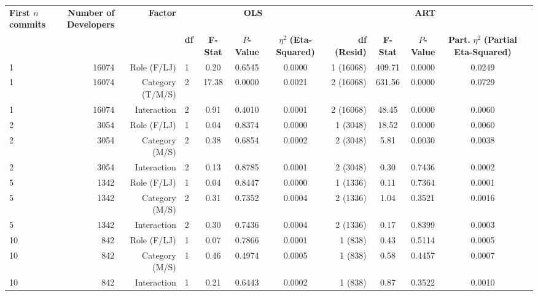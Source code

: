 \begin{landscape}
\begin{table}[H]
{}
\begin{tabular}{l r r l ccc r ccc r}
\toprule
\makecell[t]{\textbf{First $n$}\\\textbf{commits}} & \makecell[t]{\textbf{Number of}\\\textbf{Developers}} & \textbf{Factor} & \multicolumn{4}{c}{\textbf{OLS}} & \multicolumn{4}{c}{\textbf{ART}} \\ 
\cmidrule(lr){4-7} \cmidrule(lr){8-11}
 &  &  & \textbf{df} & \textbf{F-Stat} & \textbf{$P$-Value} & \makecell[t]{\textbf{$\eta^2$}\\\textbf{(Eta-Squared)}} & \textbf{df (Resid)} & \textbf{F-Stat} & \textbf{$P$-Value} & \makecell[t]{\textbf{Part.}\\\textbf{$\eta^2$}\\\textbf{(Partial}\\\textbf{Eta-Squared)}} \\ 
\midrule
1 & 16074 & Role (F/LJ) & 1 & 0.20 & 0.6545 & 0.0000 & 1 (16068) & 409.71 & 0.0000 & 0.0249 \\ 
1 & 16074 & Category (T/M/S) & 2 & 17.38 & 0.0000 & 0.0021 & 2 (16068) & 631.56 & 0.0000 & 0.0729 \\ 
1 & 16074 & Interaction & 2 & 0.91 & 0.4010 & 0.0001 & 2 (16068) & 48.45 & 0.0000 & 0.0060 \\ 
2 & 3054 & Role (F/LJ) & 1 & 0.04 & 0.8374 & 0.0000 & 1 (3048) & 18.52 & 0.0000 & 0.0060 \\ 
2 & 3054 & Category (M/S) & 2 & 0.38 & 0.6854 & 0.0002 & 2 (3048) & 5.81 & 0.0030 & 0.0038 \\ 
2 & 3054 & Interaction & 2 & 0.13 & 0.8785 & 0.0001 & 2 (3048) & 0.30 & 0.7436 & 0.0002 \\ 
5 & 1342 & Role (F/LJ) & 1 & 0.04 & 0.8447 & 0.0000 & 1 (1336) & 0.11 & 0.7364 & 0.0001 \\ 
5 & 1342 & Category (M/S) & 2 & 0.31 & 0.7352 & 0.0004 & 2 (1336) & 1.04 & 0.3521 & 0.0016 \\ 
5 & 1342 & Interaction & 2 & 0.30 & 0.7436 & 0.0004 & 2 (1336) & 0.17 & 0.8399 & 0.0003 \\ 
10 & 842 & Role (F/LJ) & 1 & 0.07 & 0.7866 & 0.0001 & 1 (838) & 0.43 & 0.5114 & 0.0005 \\ 
10 & 842 & Category (M/S) & 1 & 0.46 & 0.4974 & 0.0005 & 1 (838) & 0.58 & 0.4457 & 0.0007 \\ 
10 & 842 & Interaction & 1 & 0.21 & 0.6443 & 0.0002 & 1 (838) & 0.87 & 0.3522 & 0.0010 \\ 
\bottomrule
\end{tabular}%
\label{tab:codebase_graph_latex_repository_graph_component_time_series_ART_anova_packages} 
\end{table}
\end{landscape}
\newpage 
